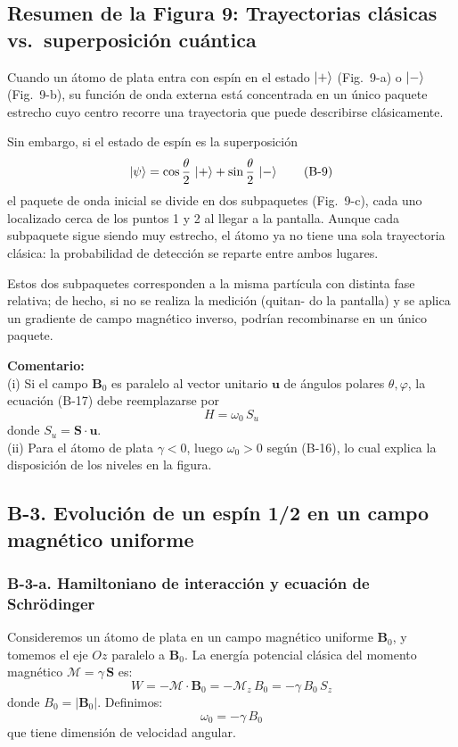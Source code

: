 \documentclass[a4paper,11pt]{article}
\begin{document}
\subsection*{Resumen de la Figura 9: Trayectorias clásicas vs.\ superposición cuántica}

Cuando un átomo de plata entra con espín en el estado $\ket{+}$ (Fig.~9-a) o $\ket{-}$ (Fig.~9-b), su función de onda externa está concentrada en un único paquete estrecho cuyo centro recorre una trayectoria que puede describirse clásicamente.  

Sin embargo, si el estado de espín es la superposición  
\[
\ket{\psi} = \cos\frac{\theta}{2}\,\ket{+} + \sin\frac{\theta}{2}\,\ket{-}
\tag{B-9}
\]
el paquete de onda inicial se divide en dos subpaquetes (Fig.~9-c), cada uno localizado cerca de los puntos 1 y 2 al llegar a la pantalla. Aunque cada subpaquete sigue siendo muy estrecho, el átomo ya no tiene una sola trayectoria clásica: la probabilidad de detección se reparte entre ambos lugares.  

Estos dos subpaquetes corresponden a la misma partícula con distinta fase relativa; de hecho, si no se realiza la medición (quitan- do la pantalla) y se aplica un gradiente de campo magnético inverso, podrían recombinarse en un único paquete.

\textbf{Comentario:}\\
(i) Si el campo $\mathbf{B}_{0}$ es paralelo al vector unitario $\mathbf{u}$ de ángulos polares $\theta,\varphi$, la ecuación (B-17) debe reemplazarse por
\begin{equation}
H=\omega_{0}\,S_{u}
\tag{B-20}
\end{equation}
donde $S_{u}=\mathbf{S}\cdot\mathbf{u}$.\\
(ii) Para el átomo de plata $\gamma<0$, luego $\omega_{0}>0$ según (B-16), lo cual explica la disposición de los niveles en la figura.

\subsection*{B-3. Evolución de un espín 1/2 en un campo magnético uniforme}

\subsubsection*{B-3-a. Hamiltoniano de interacción y ecuación de Schrödinger}

Consideremos un átomo de plata en un campo magnético uniforme $\mathbf{B}_{0}$, y tomemos el eje $O z$ paralelo a $\mathbf{B}_{0}$. La energía potencial clásica del momento magnético $\boldsymbol{\mathcal{M}}=\gamma\,\mathbf{S}$ es:
\begin{equation}
W=-\boldsymbol{\mathcal{M}}\cdot\mathbf{B}_{0}
=-\mathcal{M}_{z}\,B_{0}
=-\gamma\,B_{0}\,S_{z}
\tag{B-15}
\end{equation}
donde $B_{0}=\lvert\mathbf{B}_{0}\rvert$. Definimos:
\begin{equation}
\omega_{0}=-\gamma\,B_{0}
\tag{B-16}
\end{equation}
que tiene dimensión de velocidad angular.
\end{document}
